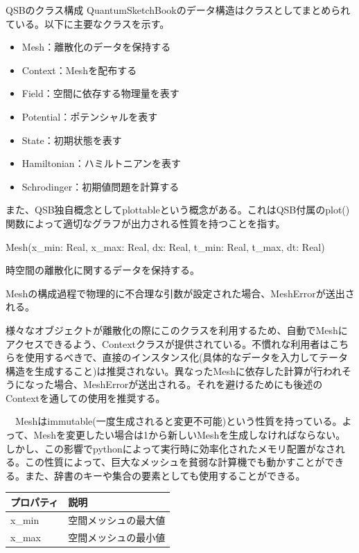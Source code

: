 \documentclass[a4paper, lualatex]{bxjsarticle}
\begin{document}
\begin{section}{QSBのクラス構成}
    \label{AppQ}
    QuantumSketchBookのデータ構造はクラスとしてまとめられている。以下に主要なクラスを示す。
    \begin{itemize}
        \item Mesh：離散化のデータを保持する
        \item Context：Meshを配布する
        \item Field：空間に依存する物理量を表す
        \item Potential：ポテンシャルを表す
        \item State：初期状態を表す
        \item Hamiltonian：ハミルトニアンを表す
        \item Schrodinger：初期値問題を計算する
    \end{itemize}
    \par また、QSB独自概念としてplottableという概念がある。これはQSB付属のplot()関数によって適切なグラフが出力される性質を持つことを指す。
    \begin{subsection}{Mesh(x\_min: Real, x\_max: Real, dx: Real, t\_min: Real, t\_max, dt: Real)}
        \par 時空間の離散化に関するデータを保持する。
        \par Meshの構成過程で物理的に不合理な引数が設定された場合、MeshErrorが送出される。
        \par 様々なオブジェクトが離散化の際にこのクラスを利用するため、自動でMeshにアクセスできるよう、Contextクラスが提供されている。不慣れな利用者はこちらを使用するべきで、直接のインスタンス化(具体的なデータを入力してテータ構造を生成すること)は推奨されない。異なったMeshに依存した計算が行われそうになった場合、MeshErrorが送出される。それを避けるためにも後述のContextを通しての使用を推奨する。
        \par　Meshはimmutable(一度生成されると変更不可能)という性質を持っている。よって、Meshを変更したい場合は1から新しいMeshを生成しなければならない。しかし、この影響でpythonによって実行時に効率化されたメモリ配置がなされる。この性質によって、巨大なメッシュを貧弱な計算機でも動かすことができる。また、辞書のキーや集合の要素としても使用することができる。 
        \begin{table}[h]
            \begin{tabular}{ll}
                プロパティ & 説明\\ \hline
                x\_min & 空間メッシュの最大値\\
                x\_max & 空間メッシュの最小値\\

\end{tabular}
\end{table}
\end{subsection}
\end{section}
\end{document}
